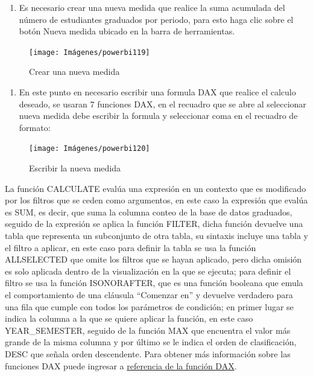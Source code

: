 \documentclass[
]{book}
\providecommand{\tightlist}{%
  \setlength{\itemsep}{0pt}\setlength{\parskip}{0pt}}
\begin{document}
\begin{enumerate}
\def\labelenumi{\arabic{enumi}.}
\setcounter{enumi}{1}
\tightlist
\item
  Es necesario crear una nueva medida que realice la suma acumulada del número de estudiantes graduados por periodo, para esto haga clic sobre el botón Nueva medida ubicado en la barra de herramientas.
\end{enumerate}

\begin{figure}

{\centering \texttt{[image: Imágenes/powerbi119]} 

}

\caption{Crear una nueva medida}\label{fig:paso2graficoareas-fig}
\end{figure}

\begin{enumerate}
\def\labelenumi{\arabic{enumi}.}
\setcounter{enumi}{2}
\tightlist
\item
  En este punto en necesario escribir una formula DAX que realice el calculo deseado, se usaran 7 funciones DAX, en el recuadro que se abre al seleccionar nueva medida debe escribir la formula y seleccionar coma en el recuadro de formato:
\end{enumerate}

\begin{figure}

{\centering \texttt{[image: Imágenes/powerbi120]} 

}

\caption{Escribir la nueva medida}\label{fig:paso3graficoareas-fig}
\end{figure}

La función CALCULATE evalúa una expresión en un contexto que es modificado por los filtros que se ceden como argumentos, en este caso la expresión que evalúa es SUM, es decir, que suma la columna conteo de la base de datos graduados, seguido de la expresión se aplica la función FILTER, dicha función devuelve una tabla que representa un subconjunto de otra tabla, su sintaxis incluye una tabla y el filtro a aplicar, en este caso para definir la tabla se usa la función ALLSELECTED que omite los filtros que se hayan aplicado, pero dicha omisión es solo aplicada dentro de la visualización en la que se ejecuta; para definir el filtro se usa la función ISONORAFTER, que es una función booleana que emula el comportamiento de una cláusula ``Comenzar en'' y devuelve verdadero para una fila que cumple con todos los parámetros de condición; en primer lugar se indica la columna a la que se quiere aplicar la función, en este caso YEAR\_SEMESTER, seguido de la función MAX que encuentra el valor más grande de la misma columna y por último se le indica el orden de clasificación, DESC que señala orden descendente. Para obtener más información sobre las funciones DAX puede ingresar a \href{https://docs.microsoft.com/en-us/dax/}{referencia de la función DAX}.
\end{document}
